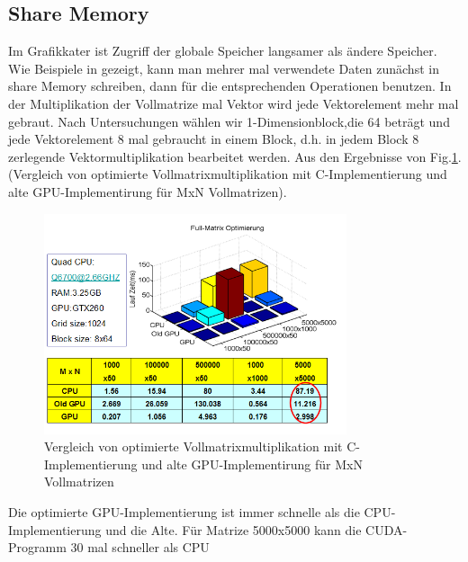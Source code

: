 \subsection{Share Memory}
Im Grafikkater ist Zugriff der globale Speicher langsamer als ändere Speicher.  Wie Beispiele in \cite{cudapg} gezeigt, kann man mehrer mal verwendete Daten zunächst in share Memory schreiben, dann für die entsprechenden Operationen benutzen. In der Multiplikation der Vollmatrize mal Vektor wird jede Vektorelement mehr mal gebraut. Nach Untersuchungen wählen wir 1-Dimensionblock,die 64 beträgt und jede Vektorelement 8 mal gebraucht in einem Block, d.h. in jedem Block 8 zerlegende Vektormultiplikation bearbeitet werden. Aus den Ergebnisse von Fig.\ref{sharememory}.(Vergleich von optimierte Vollmatrixmultiplikation mit C-Implementierung und alte GPU-Implementirung für MxN Vollmatrizen).
\begin{figure}[htbp]
\includegraphics[width=3.5in]{.//pic//sharememory}
\caption{Vergleich von optimierte Vollmatrixmultiplikation mit C-Implementierung und alte GPU-Implementirung für MxN Vollmatrizen}
\label{sharememory} 
\end{figure}

Die optimierte GPU-Implementierung ist immer schnelle als die CPU-Implementierung  und die Alte. Für Matrize 5000x5000 kann die CUDA-Programm 30 mal schneller als CPU
 
